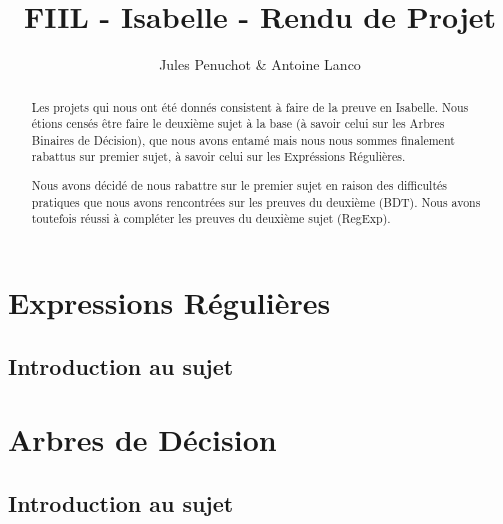 \documentclass{article}
\title{FIIL - Isabelle - Rendu de Projet}
\author{Jules Penuchot \& Antoine Lanco}
\begin{document}
\maketitle

\begin{abstract}

Les projets qui nous ont été donnés consistent à faire de la preuve en Isabelle. Nous étions censés être faire le deuxième sujet à la base (à savoir celui sur les Arbres Binaires de Décision), que nous avons entamé mais nous nous sommes finalement rabattus sur premier sujet, à savoir celui sur les Expréssions Régulières.

Nous avons décidé de nous rabattre sur le premier sujet en raison des difficultés pratiques que nous avons rencontrées sur les preuves du deuxième (BDT). Nous avons toutefois réussi à compléter les preuves du deuxième sujet (RegExp).

\end{abstract}

\section{Expressions Régulières}

\subsection{Introduction au sujet}



\section{Arbres de Décision}

\subsection{Introduction au sujet}
\end{document}
